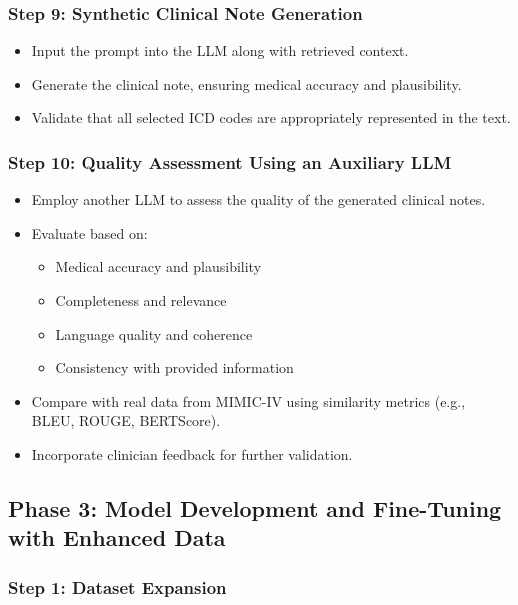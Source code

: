 \documentclass[12pt, a4paper]{article}
\begin{document}
\subsubsection{Step 9: Synthetic Clinical Note Generation}

\begin{itemize}
    \item Input the prompt into the LLM along with retrieved context.
    \item Generate the clinical note, ensuring medical accuracy and plausibility.
    \item Validate that all selected ICD codes are appropriately represented in the text.
\end{itemize}

\subsubsection{Step 10: Quality Assessment Using an Auxiliary LLM}

\begin{itemize}
    \item Employ another LLM to assess the quality of the generated clinical notes.
    \item Evaluate based on:
    \begin{itemize}
        \item Medical accuracy and plausibility
        \item Completeness and relevance
        \item Language quality and coherence
        \item Consistency with provided information
    \end{itemize}
    \item Compare with real data from MIMIC-IV using similarity metrics (e.g., BLEU, ROUGE, BERTScore).
    \item Incorporate clinician feedback for further validation.
\end{itemize}

\subsection{Phase 3: Model Development and Fine-Tuning with Enhanced Data}

\subsubsection{Step 1: Dataset Expansion}
\end{document}
